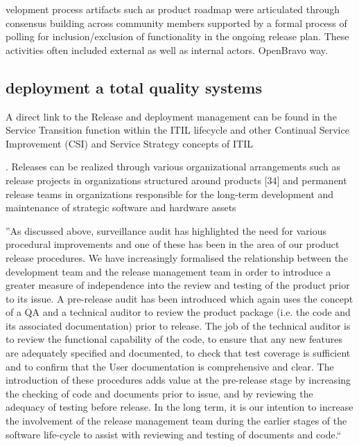  	velopment process artifacts such as product roadmap were articulated through consensus building across community members supported by a formal process of polling for inclusion/exclusion of functionality in the ongoing release plan. These activities often included external as well as internal actors.  \citep{DeodharSaxena_et_al2012} OpenBravo way.
 	
 	
\subsection{deployment a total quality systems}
 
A direct link to the Release and deployment management can be found in the Service Transition
function within the ITIL lifecycle and other Continual Service Improvement (CSI)  and Service Strategy concepts of ITIL \citep{Howard2016} 
 
 
  
 
 . Releases can be realized through various organizational arrangements such as release projects in organizations
structured around products [34] and permanent release teams in organizations responsible for the
long-term development and maintenance of strategic software and hardware assets  \citep{KakolaKoivulahtiOjala_et_al2010}


''As discussed above, surveillance audit has highlighted the need for various procedural improvements and one of these has been in the area of our product release procedures. We have increasingly formalised the relationship between the development team and the release management team in order to introduce a greater measure of independence into the review and testing of the product prior to its issue. A pre-release audit has been introduced which again uses the concept of a QA and a technical auditor to review the product package (i.e. the code and its associated documentation) prior to release. The job of the technical auditor is to review the functional capability of the code, to ensure that any new features are adequately specified and documented, to check that test coverage is sufficient and to confirm that the User documentation is comprehensive and clear. The introduction of these procedures adds value at the pre-release stage by increasing the checking of code and documents prior to issue, and by reviewing the adequacy of testing before release. In the long term, it is our intention to increase the involvement of the release management team during the earlier stages of the software life-cycle to assist with reviewing and testing of documents and code.`` \citep{Walker1970}



